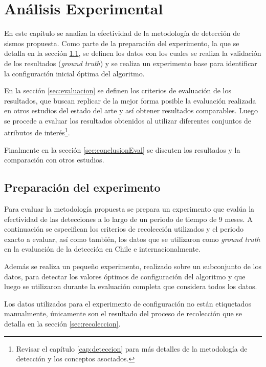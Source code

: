 

\chapter{Análisis Experimental}
\label{cap:analisis}

En este capítulo se analiza la efectividad de la metodología de detección de sismos propuesta. 
%
Como parte de la preparación del experimento, la que se detalla en la sección \ref{sec:preparacionExperimento}, se definen los datos con los cuales se realiza la validación de los resultados (\textit{ground truth})  y se realiza un experimento base para identificar la configuración inicial óptima del algoritmo.


En la sección \ref{sec:evaluacion} se definen los criterios de evaluación de los resultados, que buscan replicar de la mejor forma posible la evaluación realizada en otros estudios del estado del arte y así obtener resultados comparables.
%
Luego se procede a evaluar los resultados obtenidos al utilizar diferentes conjuntos de atributos de interés\footnote{Revisar el capítulo \ref{cap:deteccion} para más detalles de la metodología de detección y los conceptos asociados.}.

Finalmente en la sección \ref{sec:conclusionEval} se discuten los resultados y la comparación con otros estudios. 

\section{Preparación del experimento}
\label{sec:preparacionExperimento}

Para evaluar la metodología propuesta se prepara un experimento que evalúa la efectividad de las detecciones a lo largo de un periodo de tiempo de 9 meses. A continuación se especifican los criterios de recolección utilizados y el periodo exacto a evaluar, así como también, los datos que se utilizaron como \textit{ground truth} en la evaluación de la detección en Chile e internacionalmente. 

Además se realiza un pequeño experimento, realizado sobre un subconjunto de los datos, para detectar los valores óptimos de configuración del algoritmo y que luego se utilizaron durante la evaluación completa que considera todos los datos.

Los datos utilizados para el experimento de configuración no están etiquetados manualmente, únicamente son el resultado del proceso de recolección que se detalla en la sección \ref{sec:recoleccion}.


